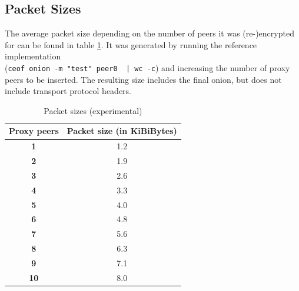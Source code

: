 \subsection{Packet Sizes}
The average packet size depending on the number of peers it was
(re-)encrypted for can be found in table \ref{pkgsizes}.
It was generated by running the reference implementation\\
(\verb=ceof onion -m "test" peer0  | wc -c=)
and increasing the number of proxy peers to be inserted.
The resulting size includes the final onion, 
but does not include transport protocol headers.
\begin{longtable}{|c|c|}
\caption{Packet sizes (experimental)}
\label{pkgsizes}\\
\hline
\textbf{Proxy peers} & \textbf{Packet size (in KiBiBytes)}\\
\hline
\textbf{1} & 1.2\\
\hline
\textbf{2} & 1.9\\
\hline
\textbf{3} & 2.6\\
\hline
\textbf{4} & 3.3\\
\hline
\textbf{5} & 4.0\\
\hline
\textbf{6} & 4.8\\
\hline
\textbf{7} & 5.6\\
\hline
\textbf{8} & 6.3\\
\hline
\textbf{9} & 7.1\\
\hline
\textbf{10} & 8.0\\
\hline
\end{longtable}
